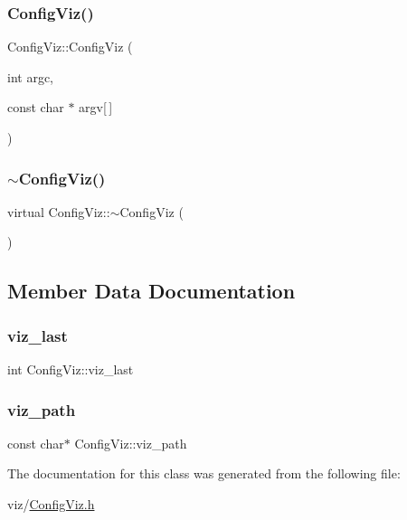 \subsubsection{\texorpdfstring{Config\+Viz()}{ConfigViz()}}
{\footnotesize\ttfamily Config\+Viz\+::\+Config\+Viz (\begin{DoxyParamCaption}\item[{int}]{argc,  }\item[{const char $\ast$}]{argv\mbox{[}$\,$\mbox{]} }\end{DoxyParamCaption})}

\mbox{\label{classConfigViz_a2adcf8c92aa6e143eef56dc8fd2a0507}} 
\subsubsection{\texorpdfstring{$\sim$\+Config\+Viz()}{~ConfigViz()}}
{\footnotesize\ttfamily virtual Config\+Viz\+::$\sim$\+Config\+Viz (\begin{DoxyParamCaption}{ }\end{DoxyParamCaption})\hspace{0.3cm}{\ttfamily [virtual]}}



\subsection{Member Data Documentation}
\mbox{\label{classConfigViz_af233d5fb057e36f7ec45f9091f4a118c}} 
\subsubsection{\texorpdfstring{viz\+\_\+last}{viz\_last}}
{\footnotesize\ttfamily int Config\+Viz\+::viz\+\_\+last}

\mbox{\label{classConfigViz_abdd3217c8d60e041cc8d896737614a9b}} 
\subsubsection{\texorpdfstring{viz\+\_\+path}{viz\_path}}
{\footnotesize\ttfamily const char$\ast$ Config\+Viz\+::viz\+\_\+path}



The documentation for this class was generated from the following file\+:\begin{DoxyCompactItemize}
\item 
viz/\mbox{\hyperlink{ConfigViz_8h}{Config\+Viz.\+h}}\end{DoxyCompactItemize}
